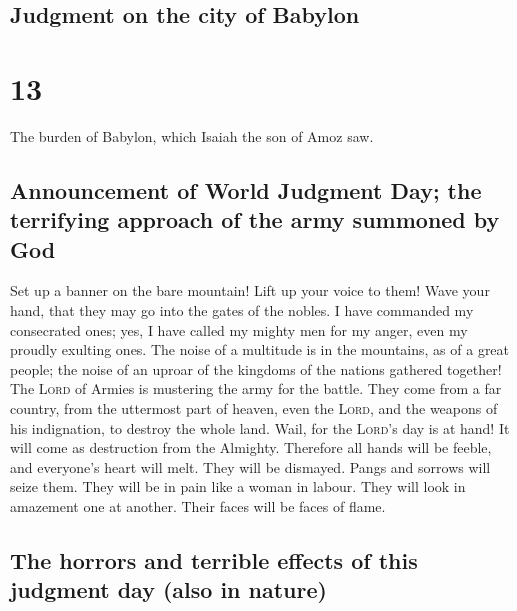 \hypertarget{judgment-on-the-city-of-babylon}{%
\subsection{Judgment on the city of
Babylon}\label{judgment-on-the-city-of-babylon}}

\hypertarget{section-12}{%
\section{13}\label{section-12}}

 The burden of Babylon, which Isaiah the son of Amoz saw.

\hypertarget{announcement-of-world-judgment-day-the-terrifying-approach-of-the-army-summoned-by-god}{%
\subsection{Announcement of World Judgment Day; the terrifying approach
of the army summoned by
God}\label{announcement-of-world-judgment-day-the-terrifying-approach-of-the-army-summoned-by-god}}

 Set up a banner on the bare mountain! Lift up your voice
to them! Wave your hand, that they may go into the gates of the nobles.
 I have commanded my consecrated ones; yes, I have called
my mighty men for my anger, even my proudly exulting ones.
 The noise of a multitude is in the mountains, as of a
great people; the noise of an uproar of the kingdoms of the nations
gathered together! The \textsc{Lord} of Armies is mustering the army for
the battle.  They come from a far country, from the
uttermost part of heaven, even the \textsc{Lord}, and the weapons of his
indignation, to destroy the whole land.  Wail, for the
\textsc{Lord}'s day is at hand! It will come as destruction from the
Almighty.  Therefore all hands will be feeble, and
everyone's heart will melt.  They will be dismayed. Pangs
and sorrows will seize them. They will be in pain like a woman in
labour. They will look in amazement one at another. Their faces will be
faces of flame.

\hypertarget{the-horrors-and-terrible-effects-of-this-judgment-day-also-in-nature}{%
\subsection{The horrors and terrible effects of this judgment day (also
in
nature)}\label{the-horrors-and-terrible-effects-of-this-judgment-day-also-in-nature}}

